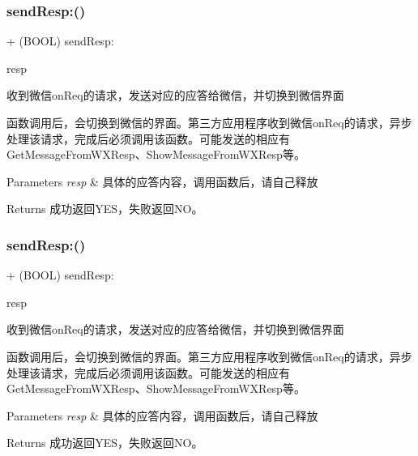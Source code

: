 \subsubsection{\texorpdfstring{send\+Resp\+:()}{sendResp:()}\hspace{0.1cm}{\footnotesize\ttfamily [1/3]}}
{\footnotesize\ttfamily + (B\+O\+OL) send\+Resp\+: \begin{DoxyParamCaption}\item[{(\mbox{\hyperlink{interface_base_resp}{Base\+Resp}} $\ast$)}]{resp }\end{DoxyParamCaption}}



收到微信on\+Req的请求，发送对应的应答给微信，并切换到微信界面 

函数调用后，会切换到微信的界面。第三方应用程序收到微信on\+Req的请求，异步处理该请求，完成后必须调用该函数。可能发送的相应有 Get\+Message\+From\+W\+X\+Resp、\+Show\+Message\+From\+W\+X\+Resp等。 
\begin{DoxyParams}{Parameters}
{\em resp} & 具体的应答内容，调用函数后，请自己释放 \\
\hline
\end{DoxyParams}
\begin{DoxyReturn}{Returns}
成功返回\+Y\+E\+S，失败返回\+N\+O。 
\end{DoxyReturn}
\mbox{\label{interface_w_x_api_ab026294e5601cd15d7b792c3de7b81d5}} 
\subsubsection{\texorpdfstring{send\+Resp\+:()}{sendResp:()}\hspace{0.1cm}{\footnotesize\ttfamily [2/3]}}
{\footnotesize\ttfamily + (B\+O\+OL) send\+Resp\+: \begin{DoxyParamCaption}\item[{(\mbox{\hyperlink{interface_base_resp}{Base\+Resp}} $\ast$)}]{resp }\end{DoxyParamCaption}}



收到微信on\+Req的请求，发送对应的应答给微信，并切换到微信界面 

函数调用后，会切换到微信的界面。第三方应用程序收到微信on\+Req的请求，异步处理该请求，完成后必须调用该函数。可能发送的相应有 Get\+Message\+From\+W\+X\+Resp、\+Show\+Message\+From\+W\+X\+Resp等。 
\begin{DoxyParams}{Parameters}
{\em resp} & 具体的应答内容，调用函数后，请自己释放 \\
\hline
\end{DoxyParams}
\begin{DoxyReturn}{Returns}
成功返回\+Y\+E\+S，失败返回\+N\+O。 
\end{DoxyReturn}
\mbox{\label{interface_w_x_api_ab026294e5601cd15d7b792c3de7b81d5}} 
